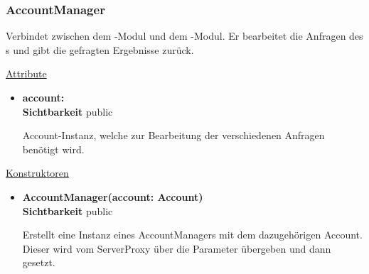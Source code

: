 \subsubsection{AccountManager} \label{service:klasse:AccountManager}
Verbindet zwischen dem -Modul und dem -Modul. Er bearbeitet die Anfragen des s und gibt die gefragten Ergebnisse zurück. \newline

\underline{Attribute}
\begin{itemize}
\itemsep0pt
\item \textbf{account: } \hfill\\ 
\textbf{Sichtbarkeit} public

Account-Instanz, welche zur Bearbeitung der verschiedenen Anfragen benötigt wird.
\end{itemize}

\underline{Konstruktoren}
\begin{itemize}
\itemsep0pt
\item \textbf{AccountManager(account: Account)} \hfill\\
\textbf{Sichtbarkeit} public

Erstellt eine Instanz eines AccountManagers mit dem dazugehörigen Account. Dieser wird vom ServerProxy über die Parameter übergeben und dann gesetzt.
\end{itemize}

